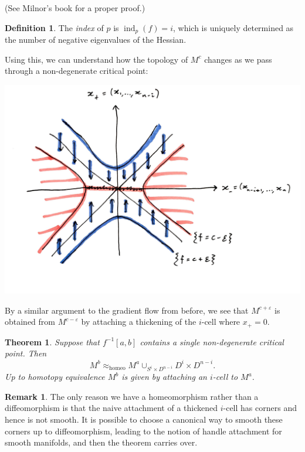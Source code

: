 \documentclass{article}
\newtheorem*{theorem}{Theorem}
\theoremstyle{definition}
\newtheorem*{definition}{Definition}
\newtheorem*{remark}{Remark}
\DeclareMathOperator{\ind}{ind}
\newcommand{\homeo}{\mathrm{homeo}}
\begin{document}
(See Milnor's book for a proper proof.)

\begin{definition}
    The \emph{index} of $p$ is $\ind_p(f)=i$, which is uniquely determined as
    the number of negative eigenvalues of the Hessian.
\end{definition}

Using this, we can understand how the topology of $M^c$ changes as we pass
through a non-degenerate critical point:

\begin{center}
    \includegraphics[scale=0.13]{morse_model}
\end{center}

By a similar argument to the gradient flow from before, we see that
$M^{c+\varepsilon}$ is obtained from $M^{c-\varepsilon}$ by attaching a
thickening of the $i$-cell where $x_+=0$.

\begin{theorem}
    Suppose that $f^{-1}[a,b]$ contains a single non-degenerate critical point.
    Then
    \begin{equation*}
        M^b \approx_\homeo M^a \cup_{S^i\times D^{n-i}}D^i\times D^{n-i}.
    \end{equation*}
    Up to homotopy equivalence $M^b$ is given by attaching an $i$-cell to $M^a$.
\end{theorem}

\begin{remark}
    The only reason we have a homeomorphism rather than a diffeomorphism is that
    the naive attachment of a thickened $i$-cell has corners and hence is not
    smooth. It is possible to choose a canonical way to smooth these corners up
    to diffeomorphism, leading to the notion of handle attachment for smooth
    manifolds, and then the theorem carries over.
\end{remark}
\end{document}
